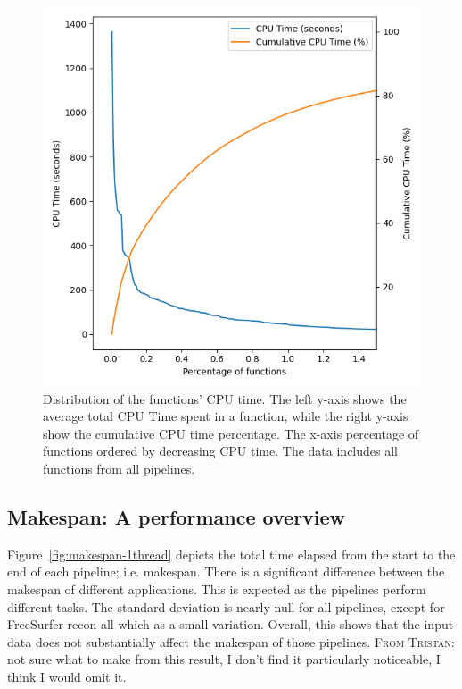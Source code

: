 \documentclass[conference]{IEEEtran}
\newcommand{\TG}[1]{\color{blue}\textsc{From Tristan: }#1\color{black}}
\begin{document}
\begin{figure}[ht]
	\centering
	\includegraphics[width=\linewidth]{figures/global-longtail.png}
	\caption{Distribution of the functions' CPU time. The left y-axis shows the average total CPU Time spent in a function, while the right y-axis show the cumulative CPU time percentage. The x-axis percentage of functions ordered by decreasing CPU time. The data includes all functions from all pipelines. }
	\label{fig:long-tail-distribution}
\end{figure}
				
\subsection{Makespan: A performance overview}
Figure~\ref{fig:makespan-1thread} depicts the total time elapsed from the start to the end of each pipeline; i.e. makespan. There is a significant difference between the makespan of different applications. This is expected as the pipelines perform different tasks. The standard deviation is nearly null for all pipelines, except for FreeSurfer recon-all which as a small variation. Overall, this shows that the input data does not substantially affect the makespan of those pipelines. \TG{not sure what to make from this result, I don't find it particularly noticeable, I think I would omit it.}
			
\end{document}

